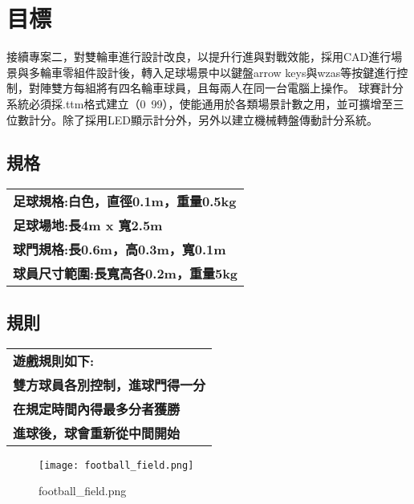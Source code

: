 \chapter{目標}
接續專案二，對雙輪車進行設計改良，以提升行進與對戰效能，採用CAD進行場景與多輪車零組件設計後，轉入足球場景中以鍵盤arrow keys與wzas等按鍵進行控制，對陣雙方每組將有四名輪車球員，且每兩人在同一台電腦上操作。
球賽計分系統必須採.ttm格式建立（0~99），使能通用於各類場景計數之用，並可擴增至三位數計分。除了採用LED顯示計分外，另外以建立機械轉盤傳動計分系統。

\section{規格}
\begin{tabular}{p{8cm}}
  \textbf{足球規格:白色，直徑0.1m，重量0.5kg} \\
  \textbf{足球場地:長4m x 寬2.5m} \\
  \textbf{球門規格:長0.6m，高0.3m，寬0.1m} \\
  \textbf{球員尺寸範圍:長寬高各0.2m，重量5kg} \\
\end{tabular}

\section{規則}
\begin{tabular}{p{8cm}}
  \textbf{遊戲規則如下:} \\
  \textbf{雙方球員各別控制，進球門得一分} \\
  \textbf{在規定時間內得最多分者獲勝} \\
  \textbf{進球後，球會重新從中間開始} \\
\end{tabular}
\begin{figure}
  \begin{center}
    \texttt{[image: football\_field.png]}
  \end{center}
  \caption{football_field.png}
  \label{fig:photo}
\end{figure}
